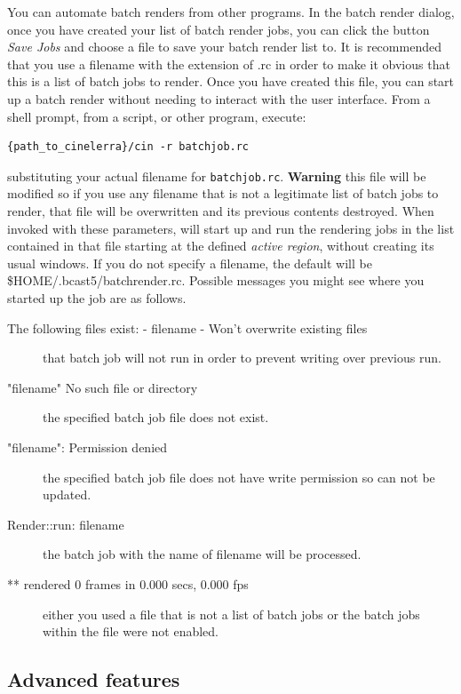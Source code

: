 You can automate \CGG{} batch renders from other programs.  In the
batch render dialog, once you have created your list of batch render
jobs, you can click the button \textit{Save Jobs} and choose a file
to save your batch render list to.  It is recommended that you use
a filename with the extension of .rc in order to make it obvious that
this is a list of batch jobs to render. Once you have created this file,
you can start up a batch render without needing to interact with the
\CGG{} user interface.  From a shell prompt, from a script, or other
program, execute:

\begin{lstlisting}[style=sh]
{path_to_cinelerra}/cin -r batchjob.rc
\end{lstlisting} substituting your actual filename for
\texttt{batchjob.rc}. \textbf{Warning} this file will be modified
so if you use any filename that is not a legitimate list of batch jobs to
render, that file will be overwritten and its previous contents destroyed.
When invoked with these parameters, \CGG{} will start up and run the
rendering jobs in the list contained in that file starting at the defined
\textit{active region}, without creating its usual windows. If you do not
specify a filename, the default will be \$HOME/.bcast5/batchrender.rc.
Possible messages you might see where you started up the job are as follows.
\begin{description}
\item[The following files exist: - filename - Won't overwrite existing files] that batch job will not run in order to prevent writing over previous run.
\item["filename" No such file or directory] the specified batch job file does not exist.
\item["filename": Permission denied] the specified batch job file does not have write permission so can not be updated.
\item[Render::run: filename] the batch job with the name of filename will be processed.
\item[** rendered 0 frames in 0.000 secs, 0.000 fps] either you used a file that is not a list of batch jobs or the batch jobs within the file were not enabled.
\end{description}

\subsection{Advanced features}%
\label{sub:advanced_features}

